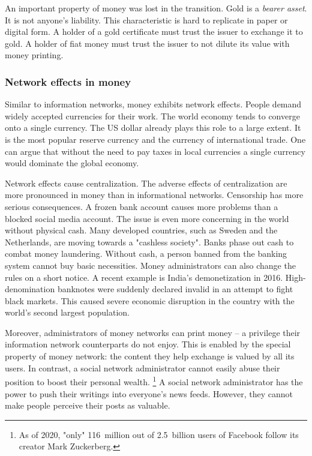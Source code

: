 An important property of money was lost in the transition.
Gold is a \textit{bearer asset}.
It is not anyone's liability.
This characteristic is hard to replicate in paper or digital form.
A holder of a gold certificate must trust the issuer to exchange it to gold.
A holder of fiat money must trust the issuer to not dilute its value with money printing.


\subsubsection*{Network effects in money}

Similar to information networks, money exhibits network effects.
People demand widely accepted currencies for their work.
The world economy tends to converge onto a single currency.
The US dollar already plays this role to a large extent.
It is the most popular reserve currency and the currency of international trade.
One can argue that without the need to pay taxes in local currencies a single currency would dominate the global economy.

Network effects cause centralization.
The adverse effects of centralization are more pronounced in money than in informational networks.
Censorship has more serious consequences.
A frozen bank account causes more problems than a blocked social media account.
The issue is even more concerning in the world without physical cash.
Many developed countries, such as Sweden and the Netherlands, are moving towards a "cashless society".
Banks phase out cash to combat money laundering.
Without cash, a person banned from the banking system cannot buy basic necessities.
Money administrators can also change the rules on a short notice.
A recent example is India's demonetization in 2016.
High-denomination banknotes were suddenly declared invalid in an attempt to fight black markets.
This caused severe economic disruption in the country with the world's second largest population.

Moreover, administrators of money networks can print money -- a privilege their information network counterparts do not enjoy.
This is enabled by the special property of money network: the content they help exchange is valued by all its users.
In contrast, a social network administrator cannot easily abuse their position to boost their personal wealth.
\footnote{As of 2020, "only" 116~million out of 2.5~billion users of Facebook follow its creator Mark Zuckerberg.}
A social network administrator has the power to push their writings into everyone's news feeds.
However, they cannot make people perceive their posts as valuable.

